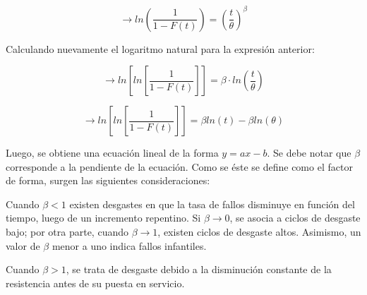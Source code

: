 \begin{equation}
\rightarrow ln\left( \frac{1}{1-F(t)} \right)=\left( \frac{t}{\theta}\right)^\beta 
\end{equation}

Calculando nuevamente el logaritmo natural para la expresión anterior:

\begin{equation}
\rightarrow ln\left[ln\left[\frac{1}{1-F(t)}\right]\right]=\beta\cdot ln\left(\frac{t}{\theta}\right)
\end{equation}

\begin{equation}
\rightarrow ln\left[ln\left[\frac{1}{1-F(t)}\right]\right]=\beta ln(t)-\beta ln(\theta)
\end{equation}

Luego, se obtiene una ecuación lineal de la forma $y=ax-b$. Se debe notar que $\beta$ corresponde a la pendiente de la ecuación. Como se éste se define como el factor de forma, surgen las siguientes consideraciones:

\begin{description}
\item Cuando $\beta<1$ existen desgastes en que la tasa de fallos disminuye en función del tiempo, luego de un incremento repentino. Si $\beta\rightarrow0$, se asocia a ciclos de desgaste bajo; por otra parte, cuando $\beta\rightarrow1$, existen ciclos de desgaste altos. Asimismo, un valor de $\beta$ menor a uno indica fallos infantiles.
\item Cuando $\beta>1$, se trata de desgaste debido a la disminución constante de la resistencia antes de su puesta en servicio.
\end{description}

